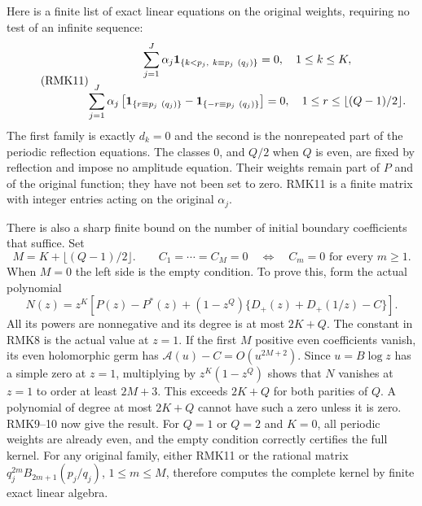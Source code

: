 \documentclass[11pt]{article}
\begin{document}
Here is a finite list of exact linear equations on the original
weights, requiring no test of an infinite sequence:
\begin{equation}\tag{RMK11}
\begin{gathered}
 \sum_{j=1}^J\alpha_j
       {\bf1}_{\{k<p_j,\ k\equiv p_j\ (q_j)\}}=0,
                         \quad 1\leq k\leq K,\\
 \sum_{j=1}^J\alpha_j\left[
       {\bf1}_{\{r\equiv p_j\ (q_j)\}}
       -{\bf1}_{\{-r\equiv p_j\ (q_j)\}}\right]=0,
                         \quad1\leq r\leq\lfloor(Q-1)/2\rfloor.
\end{gathered}
\end{equation}
The first family is exactly $d_k=0$ and the second is the nonrepeated
part of the periodic reflection equations. The classes $0$, and
$Q/2$ when $Q$ is even, are fixed by reflection and impose no
amplitude equation. Their weights remain part of $P$ and of the
original function; they have not been set to zero. RMK11 is a
finite matrix with integer entries acting on the original $\alpha_j$.

There is also a sharp finite bound on the number of initial boundary
coefficients that suffice. Set
\begin{equation}\tag{RMK12}
 M=K+\lfloor(Q-1)/2\rfloor.
 \qquad
 C_1=\cdots=C_M=0
       \quad\Longleftrightarrow\quad C_m=0\text{ for every }m\geq1.
\end{equation}
When $M=0$ the left side is the empty condition. To prove this,
form the actual polynomial
\begin{equation}\tag{RMK13}
 N(z)=z^K\left[P(z)-P^*(z)
       +(1-z^Q)\{D_+(z)+D_+(1/z)-C\}\right].
\end{equation}
All its powers are nonnegative and its degree is at most $2K+Q$.
The constant in RMK8 is the actual value at $z=1$. If the first
$M$ positive even coefficients vanish, its even holomorphic germ
has $\mathcal A(u)-C=O(u^{2M+2})$. Since $u=B\log z$ has a
simple zero at $z=1$, multiplying by $z^K(1-z^Q)$ shows that
$N$ vanishes at $z=1$ to order at least $2M+3$. This exceeds
$2K+Q$ for both parities of $Q$. A polynomial of degree at most
$2K+Q$ cannot have such a zero unless it is zero. RMK9--10 now
give the result. For $Q=1$ or $Q=2$ and $K=0$, all periodic
weights are already even, and the empty condition correctly
certifies the full kernel. For any original family, either RMK11
or the rational matrix
$q_j^{2m}B_{2m+1}(p_j/q_j)$, $1\leq m\leq M$, therefore computes
the complete kernel by finite exact linear algebra.
\end{document}

